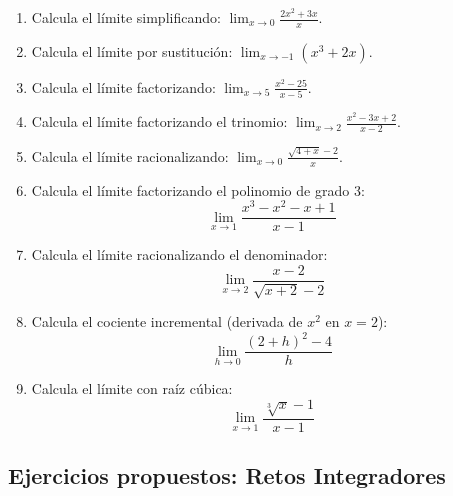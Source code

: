 \documentclass[12pt, letterpaper]{article}
\begin{document}
\begin{enumerate}[resume=ejercicios, leftmargin=*]
  \item \facil{} Calcula el límite simplificando: $\displaystyle\lim_{x \to 0} \frac{2x^2 + 3x}{x}$.

  \item \facil{} Calcula el límite por sustitución: $\displaystyle\lim_{x \to -1} (x^3 + 2x)$.

  \item \medio{} Calcula el límite factorizando: $\displaystyle\lim_{x \to 5} \frac{x^2 - 25}{x - 5}$.

  \item \medio{} Calcula el límite factorizando el trinomio: $\displaystyle\lim_{x \to 2} \frac{x^2 - 3x + 2}{x - 2}$.

  \item \medio{} Calcula el límite racionalizando: $\displaystyle\lim_{x \to 0} \frac{\sqrt{4 + x} - 2}{x}$.

  \item \dificil{} Calcula el límite factorizando el polinomio de grado 3:
        $$\lim_{x \to 1} \frac{x^3 - x^2 - x + 1}{x - 1}$$

  \item \dificil{} Calcula el límite racionalizando el denominador:
        $$\lim_{x \to 2} \frac{x - 2}{\sqrt{x + 2} - 2}$$

  \item \dificil{} Calcula el cociente incremental (derivada de $x^2$ en $x = 2$):
        $$\lim_{h \to 0} \frac{(2 + h)^2 - 4}{h}$$

  \item \muyDificil{} Calcula el límite con raíz cúbica:
        $$\lim_{x \to 1} \frac{\sqrt[3]{x} - 1}{x - 1}$$
\end{enumerate}

\subsection{Ejercicios propuestos: Retos Integradores}
\end{document}
